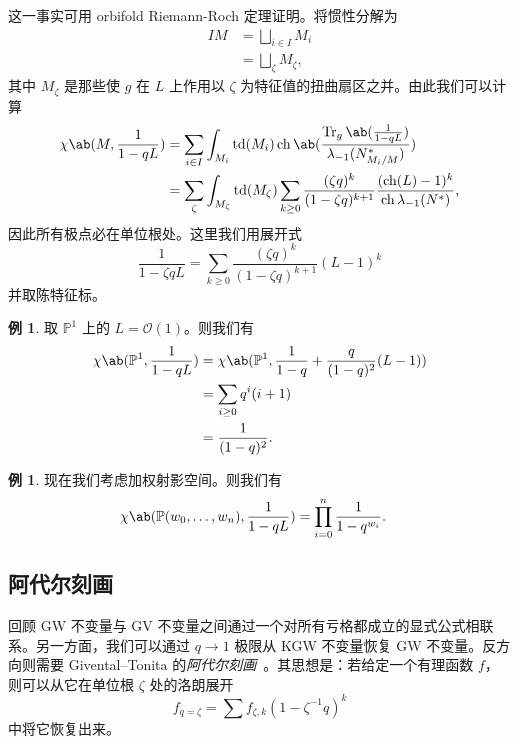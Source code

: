 \documentclass{amsart}
\theoremstyle{definition}
\newtheorem{exm}[thm]{例}
\theoremstyle{remark}
\theoremstyle{plain}
\theoremstyle{definition}
\theoremstyle{remark}
\renewcommand{\P}{\mathbb{P}}
\newcommand{\mc}[1]{\mathcal{#1}}
\newcommand{\on}[1]{\operatorname{#1}}
\newcommand{\1}{\mathbf{1}}
\newcommand{\2}{\mathbf{2}}
\newcommand{\3}{\mathbf{3}}
\DeclareMathOperator{\ch}{ch}
\begin{document}
这一事实可用 orbifold Riemann-Roch 定理证明。将惯性分解为
\begin{align*}
    IM &= \bigsqcup_{i \in I} M_i \\
    &= \bigsqcup_{\zeta} M_{\zeta},
\end{align*}
其中 \(M_{\zeta}\) 是那些使 \(g\) 在 \(L\) 上作用以 \(\zeta\) 为特征值的扭曲扇区之并。由此我们可以计算
\begin{align*}
    \chi\ab(M, \frac{1}{1-qL}) &= \sum_{i \in I} \int_{M_i} \on{td}(M_i) \on{ch} \ab(\frac{ \on{Tr}_g \ab(\frac{1}{1-qL}) }{\lambda_{-1}(N_{M_i/M}^*)}) \\
    &= \sum_{\zeta} \int_{M_{\zeta}} \on{td}(M_{\zeta}) \sum_{k \geq 0} \frac{(\zeta q)^k}{(1-\zeta q)^{k+1}} \frac{( \on{ch}(L)-1 )^k}{\ch \lambda_{-1}(N^*)},
\end{align*}
因此所有极点必在单位根处。这里我们用展开式
\[ \frac{1}{1-\zeta q L} = \sum_{k \geq 0} \frac{(\zeta q)^k}{(1-\zeta q)^{k+1}} (L-1)^k \]
并取陈特征标。

\begin{exm}
    取 \(\P^1\) 上的 \(L = \mc{O}(1)\)。则我们有
    \begin{align*}
        \chi\ab(\P^1, \frac{1}{1-qL}) &= \chi\ab(\P^1, \frac{1}{1-q} + \frac{q}{(1-q)^2}(L-1)) \\
        &= \sum_{i \geq 0} q^i (i+1) \\
        &= \frac{1}{(1-q)^2}.
    \end{align*}
\end{exm}

\begin{exm}
    现在我们考虑加权射影空间。则我们有
    \begin{align*}
        \chi\ab(\P(w_0, \ldots, w_n), \frac{1}{1-qL}) &= \prod_{i=0}^n \frac{1}{1-q^{w_i}}. 
    \end{align*}
\end{exm}


\subsection{阿代尔刻画}%
\label{sub:Adelic characterization}

回顾 GW 不变量与 GV 不变量之间通过一个对所有亏格都成立的显式公式相联系。另一方面，我们可以通过 \(q \to 1\) 极限从 KGW 不变量恢复 GW 不变量。反方向则需要 Givental--Tonita 的\textit{阿代尔刻画}~\cite{GiventalTonita2014}。其思想是：若给定一个有理函数 \(f\)，则可以从它在单位根 \(\zeta\) 处的洛朗展开
\[ f_{q=\zeta} = \sum f_{\zeta, k} (1-\zeta^{-1} q)^k \]
中将它恢复出来。
\end{document}
